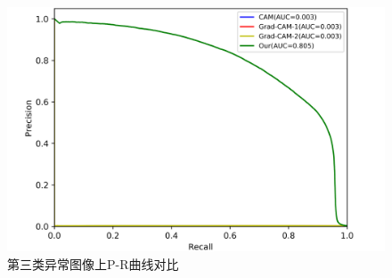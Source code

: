 \begin{figure}[H]
	\centering
	\includegraphics[width=1.0\textwidth]{figure/pr_curve_multi_skin/CIRCLE_pr_curve.png}
	\caption{第三类异常图像上P-R曲线对比}
	\label{fig:multi_simulate_pr_curve_circle}
\end{figure}


